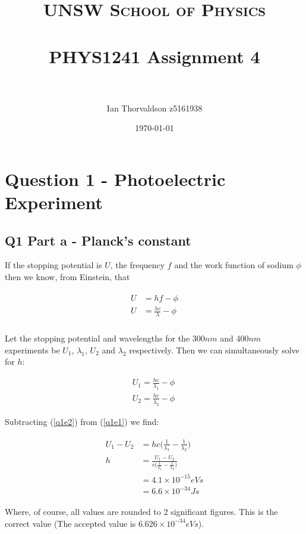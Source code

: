 \documentclass[paper=a4, fontsize=12pt]{scrartcl}
\title{	\normalfont \normalsize
\textsc{UNSW School of Physics} \\ [24pt]
\horrule{1pt} \\[0.5cm] %
\LARGE PHYS1241 Assignment 4 \\ %
\horrule{1pt} \\[0.5cm] %
}
\author{Ian Thorvaldson z5161938} %
\date{\normalsize\today} %
\begin{document}
\thispagestyle{empty}

\maketitle %

\section{Question 1 - Photoelectric Experiment}

\subsection{Q1 Part a - Planck's constant}

If the stopping potential is $U$, the frequency $f$ and the work function of sodium $\phi$ then we know, from Einstein, that

\begin{align*}
\begin{split}
U &= hf - \phi\\
U &= \frac{hc}{\lambda} - \phi\\
\end{split}
\end{align*}

Let the stopping potential and wavelengths for the $300nm$ and $400nm$ experiments be $U_1$, $\lambda_1$, $U_2$ and $\lambda_2$ respectively. Then we can simultaneously solve for $h$:

\begin{align}
U_1 = \frac{hc}{\lambda_1} - \phi ~\label{q1e1}\\
U_2 = \frac{hc}{\lambda_2} - \phi ~\label{q1e2}
\end{align}

\clearpage

Subtracting (\ref{q1e2}) from (\ref{q1e1}) we find:

\begin{align*}
\begin{split}
U_1 - U_2 &= hc \Big( \frac{1}{\lambda_1} - \frac{1}{\lambda_2} \Big)\\
h &= \frac{U_1 - U_2}{c \Big( \frac{1}{\lambda_1} - \frac{1}{\lambda_2} \Big)}\\
&= 4.1 \times 10^{-15} eV s\\
&= 6.6 \times 10^{-34} J s
\end{split}
\end{align*}

Where, of course, all values are rounded to 2 significant figures. This is the correct value (The accepted value is $6.626 \times 10^{-34} eV s$).
\end{document}
